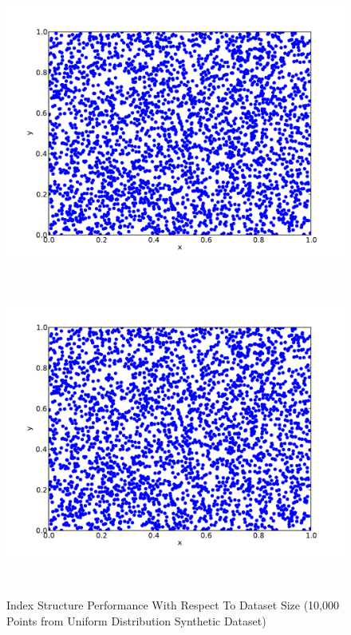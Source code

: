 \begin{figure}
	\begin{center}
		\begin{subfloat}{%
			\includegraphics[scale=0.25]{figures/uniform_distribution.pdf}
		}
		\end{subfloat}~
		\begin{subfloat}{%
			\includegraphics[scale=0.25]{figures/uniform_distribution.pdf}
		}
		\end{subfloat}~
	\end{center}

	\caption{Index Structure Performance With Respect To Dataset Size (10,000 Points from Uniform Distribution Synthetic Dataset)}
	\label{fig:perf1-size}
\end{figure}

